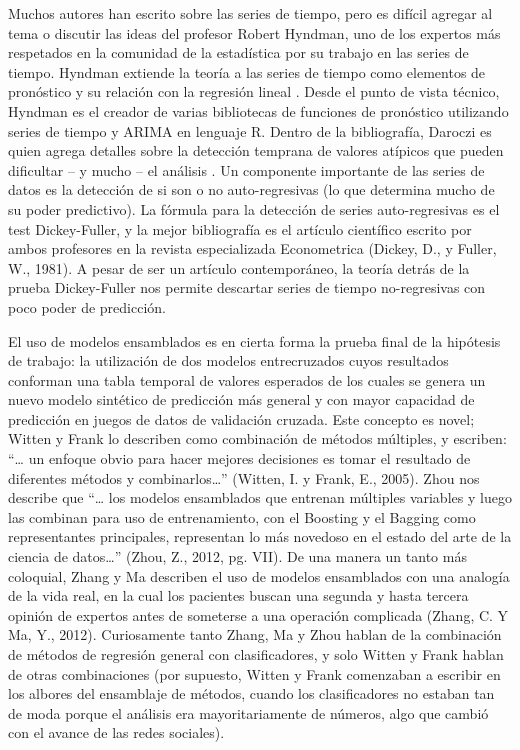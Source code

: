 Muchos autores han escrito sobre las series de tiempo, pero es difícil agregar al tema o discutir las ideas del profesor Robert Hyndman, uno de los expertos más respetados en la comunidad de la estadística por su trabajo en las series de tiempo. Hyndman extiende la teoría a las series de tiempo como elementos de pronóstico y su relación con la regresión lineal \cite{hyndman}. Desde el punto de vista técnico, Hyndman es el creador de varias bibliotecas de funciones de pronóstico utilizando series de tiempo y ARIMA en lenguaje R. Dentro de la bibliografía, Daroczi es quien agrega detalles sobre la detección temprana de valores atípicos que pueden dificultar – y mucho – el análisis \cite{daroczi}. Un componente importante de las series de datos es la detección de si son o no auto-regresivas (lo que determina mucho de su poder predictivo). La fórmula para la detección de series auto-regresivas es el test Dickey-Fuller, y la mejor bibliografía es el artículo científico escrito por ambos profesores en la revista especializada Econometrica (Dickey, D., y Fuller, W., 1981). A pesar de ser un artículo contemporáneo, la teoría detrás de la prueba Dickey-Fuller nos permite descartar series de tiempo no-regresivas con poco poder de predicción.

El uso de modelos ensamblados es en cierta forma la prueba final de la hipótesis de trabajo: la utilización de dos modelos entrecruzados cuyos resultados conforman una tabla temporal de valores esperados de los cuales se genera un nuevo modelo sintético de predicción más general y con mayor capacidad de predicción en juegos de datos de validación cruzada. Este concepto es novel; Witten y Frank lo describen como combinación de métodos múltiples, y escriben: “… un enfoque obvio para hacer mejores decisiones es tomar el resultado de diferentes métodos y combinarlos…” (Witten, I. y Frank, E., 2005). Zhou nos describe que “… los modelos ensamblados que entrenan múltiples variables y luego las combinan para uso de entrenamiento, con el Boosting y el Bagging como representantes principales, representan lo más novedoso en el estado del arte de la ciencia de datos…” (Zhou, Z., 2012, pg. VII). De una manera un tanto más coloquial, Zhang y Ma describen el uso de modelos ensamblados con una analogía de la vida real, en la cual los pacientes buscan una segunda y hasta tercera opinión de expertos antes de someterse a una operación complicada (Zhang, C. Y Ma, Y., 2012). Curiosamente tanto Zhang, Ma y Zhou hablan de la combinación de métodos de regresión general con clasificadores, y solo Witten y Frank hablan de otras combinaciones (por supuesto, Witten y Frank comenzaban a escribir en los albores del ensamblaje de métodos, cuando los clasificadores no estaban tan de moda porque el análisis era mayoritariamente de números, algo que cambió con el avance de las redes sociales).

